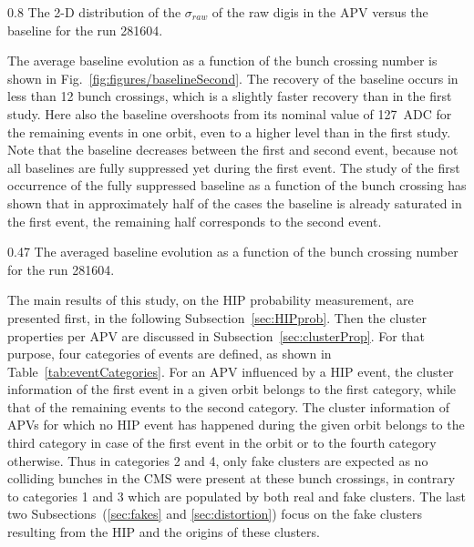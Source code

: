                  {0.8}       %
                 {The 2-D distribution of the $\sigma_{raw}$ of the raw digis in the APV versus the baseline for the run 281604.  } %


The average baseline evolution as a function of the bunch crossing number is shown in Fig.~\ref{fig:figures/baselineSecond}. The recovery of the baseline occurs in less than 12 bunch crossings, which is a slightly faster recovery than in the first study. Here also the baseline overshoots from its nominal value of 127~ADC for the remaining events in one orbit, even to a higher level than in the first study. Note that the baseline decreases between the first and second event, because not all baselines are fully suppressed yet during the first event. The study of the first occurrence of the fully suppressed baseline as a function of the bunch crossing has shown that in approximately half of the cases the baseline is already saturated in the first event, the remaining half corresponds to the second event.

                 {0.47}       %
                 {The averaged baseline evolution as a function of the bunch crossing number for the run 281604. } %
 

The main results of this study, on the HIP probability measurement, are presented first, in the following Subsection~\ref{sec:HIPprob}. Then the cluster properties per APV are discussed in Subsection~\ref{sec:clusterProp}. For that purpose, four categories of events are defined, as shown in Table~\ref{tab:eventCategories}. For an APV influenced by a HIP event, the cluster information of the first event in a given orbit belongs to the first category, while that of the remaining events to the second category. The cluster information of APVs for which no HIP event has happened during the given orbit belongs to the third category in case of the first event in the orbit or to the fourth category otherwise. Thus in categories 2 and 4, only fake clusters are expected as no colliding bunches in the CMS were present at these bunch crossings, in contrary to categories 1 and 3 which are populated by both real and fake clusters. The last two Subsections~(\ref{sec:fakes} and \ref{sec:distortion}) focus on the fake clusters resulting from the HIP and the origins of these clusters. 


